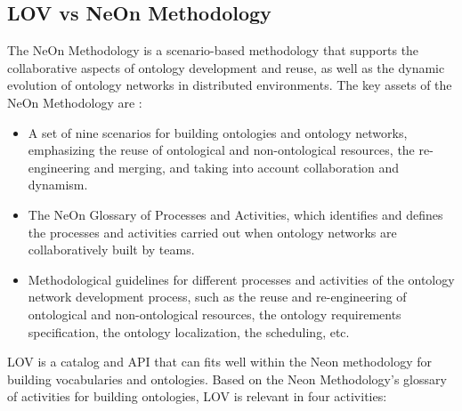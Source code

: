\subsection{LOV vs NeOn Methodology}
\label{sec:Lovandneon}
The NeOn Methodology is a scenario-based methodology that supports the collaborative aspects of ontology development and reuse, as well as the dynamic evolution of ontology networks in distributed environments. The key assets of the NeOn Methodology are \cite{MC10}:
\begin{itemize}
 \item  A set of nine scenarios for building ontologies and ontology networks, emphasizing the reuse of ontological and non-ontological resources, the re-engineering and merging, and taking into account collaboration and dynamism.
 \item The NeOn Glossary of Processes and Activities, which identifies and defines the processes and activities carried out when ontology networks are collaboratively built by teams.
 \item Methodological guidelines for different processes and activities of the ontology network development process, such as the reuse and re-engineering of ontological and non-ontological resources, the ontology requirements specification, the ontology localization, the scheduling, etc.
\end{itemize}


LOV is a catalog and API that can fits well within the Neon methodology for building vocabularies and ontologies. Based on the Neon Methodology's glossary of activities for building ontologies, LOV is relevant in four activities:


